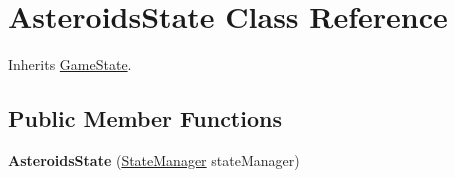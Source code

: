 \hypertarget{class_asteroids_state}{\section{Asteroids\-State Class Reference}
\label{class_asteroids_state}
}


Inherits \hyperlink{class_game_state}{Game\-State}.

\subsection*{Public Member Functions}
\begin{DoxyCompactItemize}
\item 
\hypertarget{class_asteroids_state_ac8409f9cf7c6d986eedc3dfe52b1d835}{{\bfseries Asteroids\-State} (\hyperlink{class_state_manager}{State\-Manager} state\-Manager)}\label{class_asteroids_state_ac8409f9cf7c6d986eedc3dfe52b1d835}


\end{DoxyCompactItemize}
